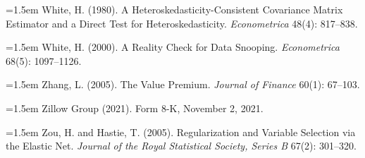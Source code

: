 \hangindent=1.5em White, H. (1980). A Heteroskedasticity-Consistent Covariance Matrix Estimator and a Direct Test for Heteroskedasticity. \emph{Econometrica} 48(4): 817--838.

\hangindent=1.5em White, H. (2000). A Reality Check for Data Snooping. \emph{Econometrica} 68(5): 1097--1126.

\hangindent=1.5em Zhang, L. (2005). The Value Premium. \emph{Journal of Finance} 60(1): 67--103.

\hangindent=1.5em Zillow Group (2021). Form 8-K, November 2, 2021.

\hangindent=1.5em Zou, H. and Hastie, T. (2005). Regularization and Variable Selection via the Elastic Net. \emph{Journal of the Royal Statistical Society, Series B} 67(2): 301--320.

\endgroup
